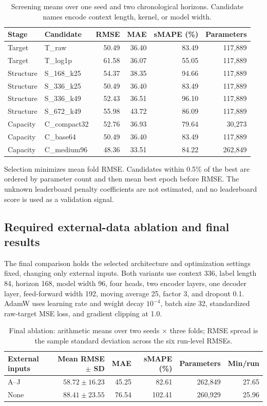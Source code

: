 \documentclass[11pt,a4paper]{article}
\begin{document}
\begin{table}[htbp]
\centering\small
\caption{Screening means over one seed and two chronological horizons. Candidate names encode context length, kernel, or model width.}\label{tab:t2screen}
\begin{tabular}{llrrrr}
\toprule
Stage & Candidate & RMSE & MAE & sMAPE (\%) & Parameters \\
\midrule
Target & T\_raw & 50.49 & 36.40 & 83.49 & 117,889 \\
Target & T\_log1p & 61.58 & 36.07 & 55.05 & 117,889 \\
Structure & S\_168\_k25 & 54.37 & 38.35 & 94.66 & 117,889 \\
Structure & S\_336\_k25 & 50.49 & 36.40 & 83.49 & 117,889 \\
Structure & S\_336\_k49 & 52.43 & 36.51 & 96.10 & 117,889 \\
Structure & S\_672\_k49 & 55.98 & 43.72 & 86.09 & 117,889 \\
Capacity & C\_compact32 & 52.76 & 36.93 & 79.64 & 30,273 \\
Capacity & C\_base64 & 50.49 & 36.40 & 83.49 & 117,889 \\
Capacity & C\_medium96 & 48.36 & 33.51 & 84.22 & 262,849 \\
\bottomrule
\end{tabular}
\end{table}

Selection minimizes mean fold RMSE. Candidates within 0.5\% of the best are ordered by parameter count and then mean best epoch before RMSE. The unknown leaderboard penalty coefficients are not estimated, and no leaderboard score is used as a validation signal.

\subsection*{Required external-data ablation and final results}
The final comparison holds the selected architecture and optimization settings fixed, changing only external inputs. Both variants use context 336, label length 84, horizon 168, model width 96, four heads, two encoder layers, one decoder layer, feed-forward width 192, moving average 25, factor 3, and dropout 0.1. AdamW uses learning rate and weight decay $10^{-4}$, batch size 32, standardized raw-target MSE loss, and gradient clipping at 1.0.

\begin{table}[htbp]
\centering\small
\caption{Final ablation: arithmetic means over two seeds $\times$ three folds; RMSE spread is the sample standard deviation across the six run-level RMSEs.}\label{tab:t2ablation}
\begin{tabular}{lrrrrr}
\toprule
External inputs & Mean RMSE $\pm$ SD & MAE & sMAPE (\%) & Parameters & Min/run\\
\midrule
A--J & $58.72\pm16.23$ & 45.25 & 82.61 & 262,849 & 27.65\\
None & $88.41\pm23.55$ & 76.54 & 102.41 & 260,929 & 25.96\\
\bottomrule
\end{tabular}
\end{table}
\end{document}

